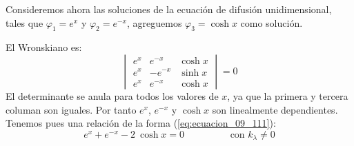 Consideremos ahora las soluciones de la ecuación de difusión unidimensional, tales que $\varphi_{1} = e^{x}$ y $\varphi_{2} = e^{-x}$, agreguemos $\varphi_{3} = \cosh x$ como solución. 

El Wronskiano es:
\[ \begin{vmatrix}
e^{x}  & e^{-x} & \cosh x \\
e^{x}  & -e^{-x} & \sinh x \\
e^{x}  & e^{-x} & \cosh x
\end{vmatrix} = 0 \]
El determinante se anula para todos los valores de $x$, ya que la primera y tercera columan son iguales. Por tanto $e^{x}$, $e^{-x}$ y $\cosh	x$ son linealmente dependientes. Tenemos pues una relación de la forma (\ref{eq:ecuacion_09_111}):
\[ e^{x} + e^{-x} - 2 \: \cosh x = 0 \hspace{2cm} \text{con } k_{\lambda} \neq 0 \]
